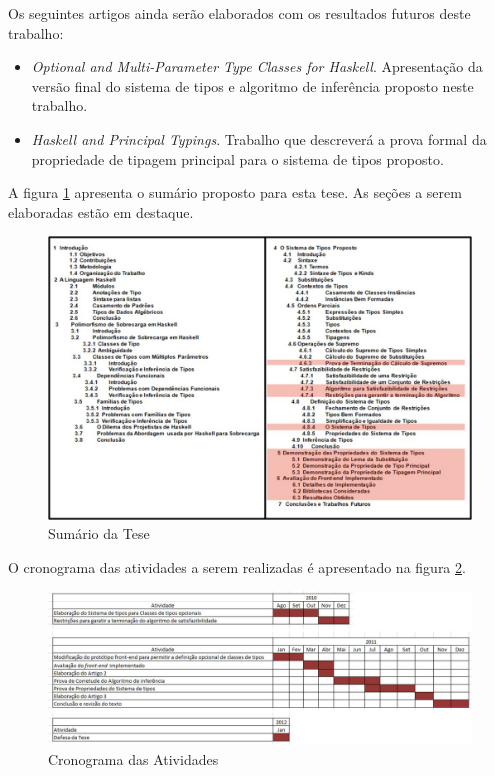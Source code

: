 Os seguintes artigos ainda ser\~ao elaborados com os resultados futuros deste trabalho:
\begin{itemize}
	\item \emph{Optional and Multi-Parameter Type Classes for Haskell}. Apresenta\c{c}\~ao da vers\~ao final do sistema de
	      tipos e algoritmo de infer\^encia proposto neste trabalho.
	\item \emph{Haskell and Principal Typings}. Trabalho que descrever\'a a prova formal da propriedade de tipagem
	      principal para o sistema de tipos proposto.
\end{itemize}

A figura \ref{sumario} apresenta o sum\'ario proposto para esta tese. As se\c{c}\~oes a serem elaboradas est\~ao em 
destaque.

\begin{figure}[htp]			
	\centering
	\includegraphics[scale=0.5]{sumario.jpg}
	\caption{Sum\'ario da Tese}
	\label{sumario}
\end{figure}		

O cronograma das atividades a serem realizadas \'e apresentado na figura \ref{cronograma}.

\begin{figure}[t]			
	\centering
	\includegraphics[scale=0.5]{cronograma.jpg}
	\caption{Cronograma das Atividades}
	\label{cronograma}
\end{figure}	
